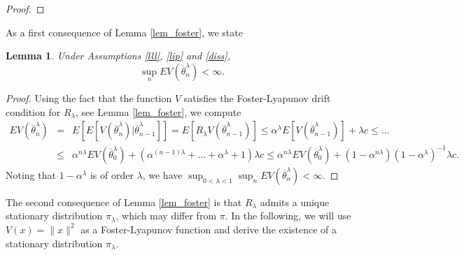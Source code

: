 \documentclass[a4paper]{article}
\newtheorem{lemma}[theorem]{Lemma}
\def\e{\text{e}}
\def\Rd{\mathbb{R}^d}
\def\1{\mathds{1}}
\begin{document}
\begin{proof}
\end{proof}

As a first consequence of Lemma \ref{lem_foster}, we state
\begin{lemma}\label{lavel} Under Assumptions \ref{lll}, \ref{lip} and \ref{diss},
$$
\sup_n EV(\overline{\theta}^{\lambda}_n)<\infty.
$$
\end{lemma}
\begin{proof}
Using the fact that the function $V$ satisfies the Foster-Lyapunov drift condition for $R_{\lambda}$, see Lemma \ref{lem_foster}, we compute
\begin{eqnarray*}
EV(\overline{\theta}^{\lambda}_n) &=& E\left[ E[V(\overline{\theta}^{\lambda}_n) | \overline{\theta}^{\lambda}_{n-1} ] \right] =
E\left[ R_{\lambda} V(\overline{\theta}^{\lambda}_{n-1})  \right]\leq \alpha^{\lambda}E[V(\overline{\theta}^{\lambda}_{n-1}) ] + \lambda c \le\ldots \\
&\le& \alpha^{n \lambda} EV(\overline{\theta}^{\lambda}_0) + (\alpha^{(n-1)\lambda} + \ldots + \alpha^{\lambda}+1) \lambda c \le  \alpha^{n \lambda} EV(\overline{\theta}^{\lambda}_0) + (1-\alpha^{n\lambda})(1-\alpha^{\lambda})^{-1} \lambda c.
\end{eqnarray*}
Noting that $1-\alpha ^{\lambda}$ is of order $\lambda$, we have
$\sup_{0<\lambda<1}\sup_n EV(\overline{\theta}^{\lambda}_n)<\infty$.
\end{proof}

The second consequence of Lemma \ref{lem_foster} is that $R_{\lambda}$ admits a unique stationary distribution $\pi_{\lambda}$, which may differ from $\pi$.
In the following, we will use $V(x) = \|x\|^2$ as a Foster-Lyapunov function and derive the existence of a stationary distribution $\pi_{\lambda}$.
\end{document}
